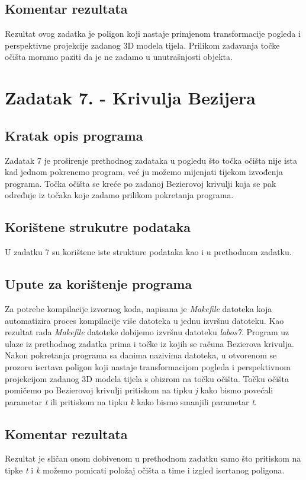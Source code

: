 \documentclass{report}
\begin{document}
\subsection{Komentar rezultata}
Rezultat ovog zadatka je poligon koji nastaje primjenom transformacije pogleda i perspektivne projekcije zadanog 3D modela tijela. Prilikom zadavanja točke očišta moramo paziti da je ne zadamo u unutrašnjosti objekta.

\section{Zadatak 7. - Krivulja Bezijera}
\subsection{Kratak opis programa}
Zadatak 7 je proširenje prethodnog zadataka u pogledu što točka očišta nije ista kad jednom pokrenemo program, već ju možemo mijenjati tijekom izvođenja programa. Točka očišta se kreće po zadanoj Bezierovoj krivulji koja se pak određuje iz točaka koje zadamo prilikom pokretanja programa. 

\subsection{Korištene strukutre podataka}
U zadatku 7 su korištene iste strukture podataka kao i u prethodnom zadatku.

\subsection{Upute za korištenje programa}
Za potrebe kompilacije izvornog koda, napisana je \textit{Makefile} datoteka koja automatizira proces kompilacije više datoteka u jednu izvršnu datoteku. Kao rezultat rada \textit{Makefile} datoteke dobijemo izvršnu datoteku \textit{labos7}. Program uz ulaze iz prethodnog zadatka prima i točke iz kojih se računa Bezierova krivulja. Nakon pokretanja programa sa danima nazivima datoteka, u otvorenom se prozoru iscrtava poligon koji nastaje transformacijom pogleda i perspektivnom projekcijom zadanog 3D modela tijela s obizrom na točku očišta. Točku očišta pomičemo po Bezierovoj krivulji pritiskom na tipku \textit{j} kako bismo povećali parametar \textit{t} ili pritiskom na tipku \textit{k} kako bismo smanjili parametar \textit{t}.

\subsection{Komentar rezultata}
Rezultat je sličan onom dobivenom u prethodnom zadatku samo što pritiskom na tipke \textit{t} i \textit{k} možemo pomicati položaj očišta a time i izgled iscrtanog poligona.
\end{document}
